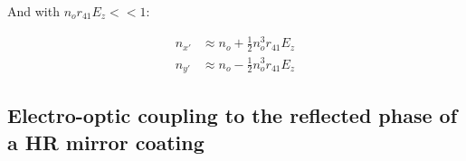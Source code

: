 \noindent And with $n_o r_{41} E_z << 1$:

\begin{equation}
    \begin{aligned}
	n_{x'} & \approx  n_o + \frac{1}{2} n_o^3 r_{41} E_z \\
	n_{y'} & \approx n_o - \frac{1}{2} n_o^3 r_{41} E_z    
    \end{aligned}
\end{equation}

\subsection{Electro-optic coupling to the reflected phase of a HR mirror coating}


%


